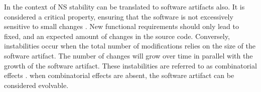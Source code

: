 In the context of NS stability can be translated to software artifacts also. It is
considered a critical property, ensuring that the software is not excessively sensitive to
small changes \autocite[270]{mannaert_normalized_2016}. New functional requirements should
only lead to fixed, and an expected amount of changes in the source code. Conversely,
instabilities occur when the total number of modifications relies on the size of the
software artifact. The number of changes will grow over time in parallel with the growth
of the software artifact. These instabilities are referred to as combinatorial effects
\autocite[270]{mannaert_normalized_2016}. when combinatorial effects are absent, the
software artifact can be considered evolvable.